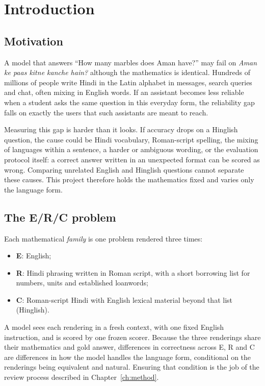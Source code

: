 \documentclass[12pt,a4paper,oneside]{report}
\renewcommand{\_}{\oldunderscore\allowbreak}
\newcommand{\form}[1]{\textbf{#1}}
\begin{document}
\cleardoublepage
{}

\chapter{Introduction}
\label{ch:intro}

\section{Motivation}

A model that answers ``How many marbles does Aman have?'' may fail on \emph{Aman ke paas kitne kanche hain?} although the mathematics is identical. Hundreds of millions of people write Hindi in the Latin alphabet in messages, search queries and chat, often mixing in English words. If an assistant becomes less reliable when a student asks the same question in this everyday form, the reliability gap falls on exactly the users that such assistants are meant to reach.

Measuring this gap is harder than it looks. If accuracy drops on a Hinglish question, the cause could be Hindi vocabulary, Roman-script spelling, the mixing of languages within a sentence, a harder or ambiguous wording, or the evaluation protocol itself: a correct answer written in an unexpected format can be scored as wrong. Comparing unrelated English and Hinglish questions cannot separate these causes. This project therefore holds the mathematics fixed and varies only the language form.

\section{The E/R/C problem}

Each mathematical \emph{family} is one problem rendered three times:
\begin{itemize}[nosep]
\item \form{E}: English;
\item \form{R}: Hindi phrasing written in Roman script, with a short borrowing list for numbers, units and established loanwords;
\item \form{C}: Roman-script Hindi with English lexical material beyond that list (Hinglish).
\end{itemize}
A model sees each rendering in a fresh context, with one fixed English instruction, and is scored by one frozen scorer. Because the three renderings share their mathematics and gold answer, differences in correctness across E, R and C are differences in how the model handles the language form, conditional on the renderings being equivalent and natural. Ensuring that condition is the job of the review process described in Chapter~\ref{ch:method}.
\end{document}
